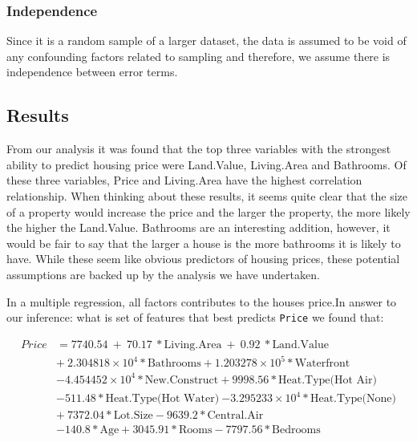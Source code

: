 \documentclass[letterpaper,9pt,twocolumn,twoside,]{pinp}
\begin{document}
\hypertarget{independence}{%
\subsubsection{Independence}\label{independence}}

Since it is a random sample of a larger dataset, the data is assumed to
be void of any confounding factors related to sampling and therefore, we
assume there is independence between error terms.

\hypertarget{results}{%
\subsection{Results}\label{results}}

From our analysis it was found that the top three variables with the
strongest ability to predict housing price were Land.Value, Living.Area
and Bathrooms. Of these three variables, Price and Living.Area have the
highest correlation relationship. When thinking about these results, it
seems quite clear that the size of a property would increase the price
and the larger the property, the more likely the higher the Land.Value.
Bathrooms are an interesting addition, however, it would be fair to say
that the larger a house is the more bathrooms it is likely to have.
While these seem like obvious predictors of housing prices, these
potential assumptions are backed up by the analysis we have undertaken.

In a multiple regression, all factors contributes to the houses price.In
answer to our inference: what is set of features that best predicts
\texttt{Price} we found that:

\begin{equation}
  \begin{aligned}
Price&=7740.54\ +\ 70.17\ * \text{Living.Area}\ +\ 0.92\ * \text{Land.Value} \\
&+\ \ensuremath{2.304818\times 10^{4}} * \text{Bathrooms} + \ensuremath{1.203278\times 10^{5}} * \text{Waterfront}\   \\
& \ensuremath{-4.454452\times 10^{4}} * \text{New.Construct} + 9998.56 * \text{Heat.Type(Hot Air)}\ \\
& -511.48 * \text{Heat.Type(Hot Water)}\ \ensuremath{-3.295233\times 10^{4}} * \text{Heat.Type(None)}\\
&+\ 7372.04 * \text{Lot.Size} - 9639.2 * \text{Central.Air}\\
& -140.8 * \text{Age} + 3045.91 * \text{Rooms}  -7797.56 * \text{Bedrooms}\\
       \label{eqn:example}
  \end{aligned}
\end{equation}
\end{document}
